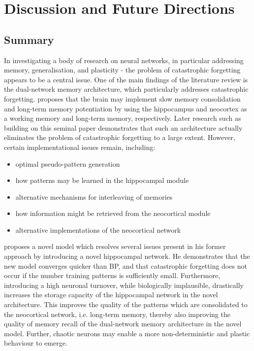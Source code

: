 
\chapter{Discussion and Future Directions}\label{discussion_future_work}
\section{Summary}


In investigating a body of research on neural networks, in particular addressing memory, generalisation, and plasticity - the problem of catastrophic forgetting appears to be a central issue. One of the main findings of the literature review is the dual-network memory architecture, which particularly addresses catastrophic forgetting. \cite{McClelland1995} proposes that the brain may implement slow memory consolidation and long-term memory potentiation by using the hippocampus and neocortex as a working memory and long-term memory, respectively. Later research such as \citep{French1997, Ans1997, Ans2000, French2001, Hattori2010, Hattori2014} building on this seminal paper demonstrates that such an architecture actually eliminates the problem of catastrophic forgetting to a large extent. However, certain implementational issues remain, including:
\begin{itemize}
\item optimal pseudo-pattern generation
\item how patterns may be learned in the hippocampal module
\item alternative mechanisms for interleaving of memories
\item how information might be retrieved from the neocortical module
\item alternative implementations of the neocortical network
\end{itemize}

\cite{Hattori2014} proposes a novel model which resolves several issues present in his former approach by introducing a novel hippocampal network. He demonstrates that the new model converges quicker than BP, and that catastrophic forgetting does not occur if the number training patterns is sufficiently small. Furthermore, introducing a high neuronal turnover, while biologically implausible, drastically increases the storage capacity of the hippocampal network in the novel architecture. This improves the quality of the patterns which are consolidated to the neocortical network, i.e. long-term memory, thereby also improving the quality of memory recall of the dual-network memory architecture in the novel model. Further, chaotic neurons may enable a more non-deterministic and plastic behaviour to emerge.

